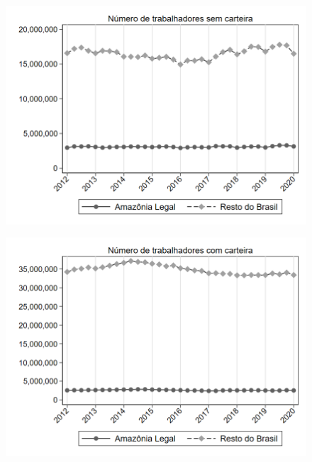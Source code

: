 \begin{frame}[label=_estrutura_emprego_n_empregadoSC]{}
\textit{\hyperlink{_estrutura_emprego}{}}
\begin{figure}
  \centering
  \includegraphics[width=1.0\linewidth]{../../analysis/output/estrutura_emprego/_estrutura_emprego_n_empregadoSC.png}
  \caption{}
  \label{fig:_estrutura_emprego_n_empregadoSC}
\end{figure}
\end{frame}

\begin{frame}[label=_estrutura_emprego_n_empregadoCC]{}
\textit{\hyperlink{_estrutura_emprego}{}}
\begin{figure}
  \centering
  \includegraphics[width=1.0\linewidth]{../../analysis/output/estrutura_emprego/_estrutura_emprego_n_empregadoCC.png}
  \caption{}
  \label{fig:_estrutura_emprego_n_empregadoCC}
\end{figure}
\end{frame}

